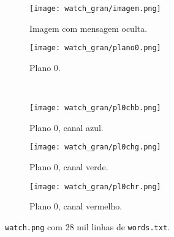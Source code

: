 \begin{figure}[H]
    \centering
    \begin{subfigure}{0.4\textwidth}
        \centering
        \texttt{[image: watch\_gran/imagem.png]}
        \caption{Imagem com mensagem oculta.}
        \label{fig:grande:imagem}
    \end{subfigure}%
    \begin{subfigure}{0.4\textwidth}
        \centering
        \texttt{[image: watch\_gran/plano0.png]}
        \caption{Plano 0.}
        \label{fig:grande:plano}
    \end{subfigure}\\[8pt]
    \begin{subfigure}{0.28\textwidth}
        \centering
        \texttt{[image: watch\_gran/pl0chb.png]}
        \caption{Plano 0, canal azul.}
        \label{fig:grande:blue}
    \end{subfigure}%
    \begin{subfigure}{0.28\textwidth}
        \centering
        \texttt{[image: watch\_gran/pl0chg.png]}
        \caption{Plano 0, canal verde.}
        \label{fig:grande:green}
    \end{subfigure}%
    \begin{subfigure}{0.28\textwidth}
        \centering
        \texttt{[image: watch\_gran/pl0chr.png]}
        \caption{Plano 0, canal vermelho.}
        \label{fig:grande:red}
    \end{subfigure}%

    \caption{\texttt{watch.png} com 28 mil linhas de \texttt{words.txt}.}
    \label{fig:grande}
\end{figure}